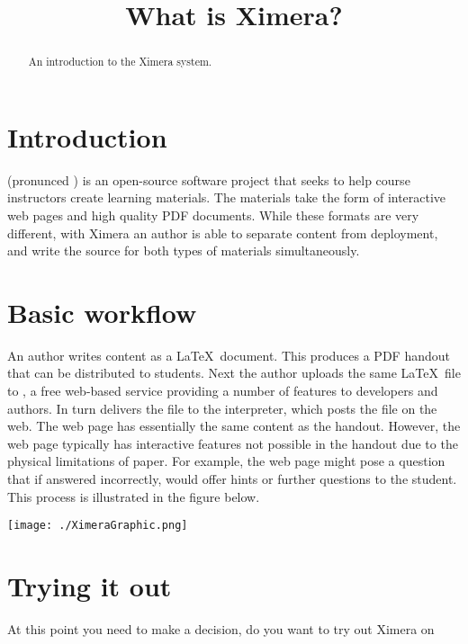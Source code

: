 \documentclass{ximera}
\title{What is Ximera?}
\begin{document}
\begin{abstract}
An introduction to the Ximera system.
\end{abstract}
\maketitle


\section{Introduction}

 (pronunced ) is an
open-source software project that seeks to help course instructors
create learning materials.  The materials take the form of interactive
web pages and high quality PDF documents.  While these formats are
very different, with Ximera an author is able to separate content from
deployment, and write the source for both types of materials
simultaneously.

\section{Basic workflow}

An author writes content as a \LaTeX\ document.  This produces a PDF
handout that can be distributed to students.  Next the author uploads
the same \LaTeX\ file to , a free
web-based service providing a number of features to developers and
authors.  In turn  delivers the
file to the  interpreter, which
  posts the file on the web.  The web page has essentially the same
  content as the handout.  However, the web page typically has
  interactive features not possible in the handout due to the physical
  limitations of paper.  For example, the web page might pose a
  question that if answered incorrectly, would offer hints or further
  questions to the student.  This process is illustrated in the figure
  below.

\begin{image}
\texttt{[image: ./XimeraGraphic.png]}
\end{image}

\section{Trying it out}

At this point you need to make a decision, do you want to try out
Ximera on
\end{document}
